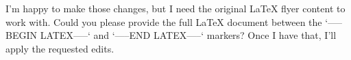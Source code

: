 I’m happy to make those changes, but I need the original LaTeX flyer content to work with. Could you please provide the full LaTeX document between the `-----BEGIN LATEX-----` and `-----END LATEX-----` markers? Once I have that, I’ll apply the requested edits.
